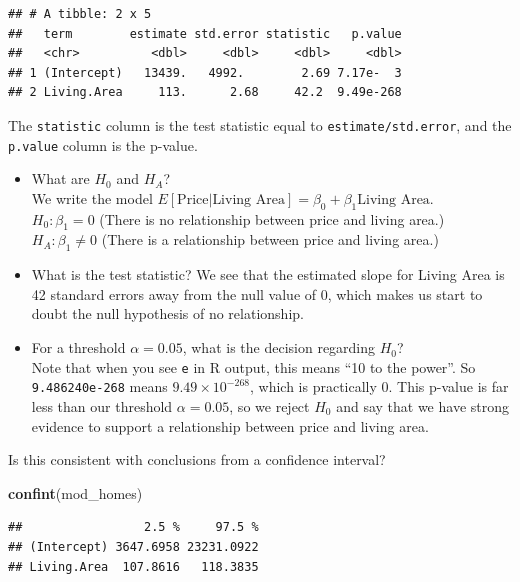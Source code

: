 \documentclass[
]{book}
\newenvironment{Shaded}{\begin{snugshade}}{\end{snugshade}}
\newcommand{\KeywordTok}[1]{\textcolor[rgb]{0.13,0.29,0.53}{\textbf{#1}}}
\newcommand{\NormalTok}[1]{#1}
\begin{document}
\begin{verbatim}
## # A tibble: 2 x 5
##   term        estimate std.error statistic   p.value
##   <chr>          <dbl>     <dbl>     <dbl>     <dbl>
## 1 (Intercept)   13439.   4992.        2.69 7.17e-  3
## 2 Living.Area     113.      2.68     42.2  9.49e-268
\end{verbatim}

The \texttt{statistic} column is the test statistic equal to \texttt{estimate/std.error}, and the \texttt{p.value} column is the p-value.

\begin{itemize}
\item
  What are \(H_0\) and \(H_A\)?\\
  We write the model \(E[\text{Price}|\text{Living Area} ] = \beta_0 + \beta_1\text{Living Area}\).\\
  \(H_0: \beta_1 = 0\) (There is no relationship between price and living area.)\\
  \(H_A: \beta_1 \neq 0\) (There is a relationship between price and living area.)
\item
  What is the test statistic?
  We see that the estimated slope for Living Area is 42 standard errors away from the null value of 0, which makes us start to doubt the null hypothesis of no relationship.
\item
  For a threshold \(\alpha = 0.05\), what is the decision regarding \(H_0\)?\\
  Note that when you see \texttt{e} in R output, this means ``10 to the power''. So \texttt{9.486240e-268} means \(9.49 \times 10^{-268}\), which is practically 0. This p-value is far less than our threshold \(\alpha = 0.05\), so we reject \(H_0\) and say that we have strong evidence to support a relationship between price and living area.
\end{itemize}

Is this consistent with conclusions from a confidence interval?

\begin{Shaded}
\begin{Highlighting}[]
\KeywordTok{confint}\NormalTok{(mod_homes)}
\end{Highlighting}
\end{Shaded}

\begin{verbatim}
##                 2.5 %     97.5 %
## (Intercept) 3647.6958 23231.0922
## Living.Area  107.8616   118.3835
\end{verbatim}
\end{document}
